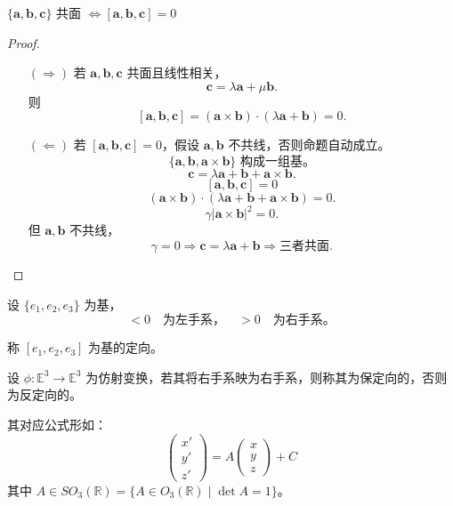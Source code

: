 \documentclass[lang=cn,10pt,thmcnt=section]{elegantbook}
\renewcommand{\vec}[1]{\mathbf{#1}}
\begin{document}
\begin{proposition}
    $\{\vec{a}, \vec{b}, \vec{c}\}$ 共面 $\Leftrightarrow [\vec{a}, \vec{b}, \vec{c}] = 0$
\end{proposition}
\begin{proof}
    \begin{itemize}
        \item[$(\Rightarrow)$] 若 $\vec{a}, \vec{b}, \vec{c}$ 共面且线性相关，
        \[
        \vec{c} = \lambda \vec{a} + \mu \vec{b}.
        \]
        则
        \[
        [\vec{a}, \vec{b}, \vec{c}] = (\vec{a} \times \vec{b}) \cdot (\lambda \vec{a} + \vec{b}) = 0.
        \]
        
        \item[$(\Leftarrow)$] 若 $[\vec{a}, \vec{b}, \vec{c}] = 0$，假设 $\vec{a}, \vec{b}$ 不共线，否则命题自动成立。
        \[
        \{\vec{a}, \vec{b}, \vec{a} \times \vec{b}\} \text{ 构成一组基。}
        \]
        \[
        \vec{c} = \lambda \vec{a} + \vec{b} + \vec{a} \times \vec{b}.
        \]
        \[
        [\vec{a}, \vec{b}, \vec{c}] = 0
        \]
        \[
        (\vec{a} \times \vec{b}) \cdot (\lambda \vec{a} + \vec{b} + \vec{a} \times \vec{b}) = 0.
        \]
        \[
        \gamma |\vec{a} \times \vec{b}|^2 = 0.
        \]
        但 $\vec{a}, \vec{b}$ 不共线，
        \[
        \gamma = 0 \Rightarrow \vec{c} = \lambda \vec{a} + \vec{b} \Rightarrow \text{三者共面}.
        \]
    \end{itemize}
    \end{proof}
\begin{definition}[左手系和右手系]
    设 $\{e_1, e_2, e_3\}$ 为基，
    \begin{equation}
    [e_1, e_2, e_3] < 0 \quad \text{为左手系，} \quad > 0 \quad \text{为右手系。}
    \end{equation}
\end{definition}
\begin{definition}[定向]
    称 $[e_1, e_2, e_3]$ 为基的定向。
\end{definition}
\begin{definition}[保定向]
    设 $\phi: \mathbb{E}^3 \rightarrow \mathbb{E}^3$ 为仿射变换，若其将右手系映为右手系，则称其为保定向的，否则为反定向的。
\end{definition}
\begin{theorem}[刚体运动的坐标]
    其对应公式形如：
    \begin{equation}
    \begin{pmatrix}
    x' \\
    y' \\
    z'
    \end{pmatrix}
    = A
    \begin{pmatrix}
    x \\
    y \\
    z
    \end{pmatrix}
    + C
    \end{equation}
    其中 $A \in SO_3(\mathbb{R}) = \{A \in O_3(\mathbb{R}) \mid \det A = 1\}$。
\end{theorem}
\end{document}
